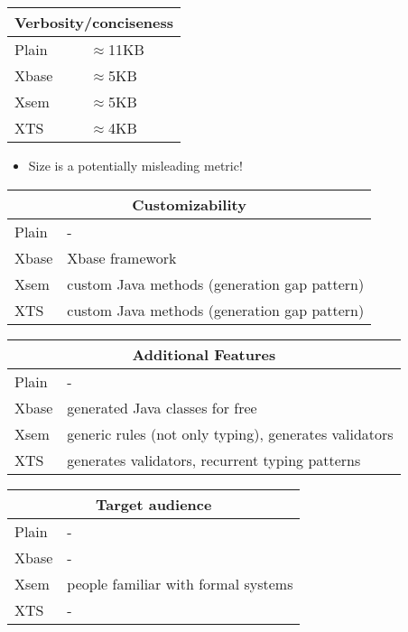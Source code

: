 \begin{frame}
\framebreak
\begin{tabularx}{\linewidth}{ l   X }
\multicolumn{2}{c}{Verbosity/conciseness} \\ \hline
Plain & $\approx$11KB \\%
Xbase &$\approx$5KB \\%
Xsem & $\approx$5KB \\%
XTS & $\approx$4KB \\%
\end{tabularx}

\begin{itemize}
  \item Size is a potentially misleading metric! 
\end{itemize}


\framebreak
\begin{tabularx}{\linewidth}{ l   X }
\multicolumn{2}{c}{Customizability} \\ \hline
Plain & - \\
Xbase & Xbase framework \\
Xsem & custom Java methods (generation gap pattern)\\
XTS & custom Java methods (generation gap pattern) \\
\end{tabularx}

\framebreak
\begin{tabularx}{\linewidth}{ l   X }
\multicolumn{2}{c}{Additional Features} \\ \hline
Plain & - \\
Xbase & generated Java classes for free \\
Xsem & generic rules (not only typing), generates validators \\
XTS & generates validators, recurrent typing patterns \\
\end{tabularx}

\framebreak
\begin{tabularx}{\linewidth}{ l   X }
\multicolumn{2}{c}{Target audience} \\ \hline
Plain & - \\
Xbase & - \\
Xsem & people familiar with formal systems \\
XTS & - \\
\end{tabularx}


\end{frame}
